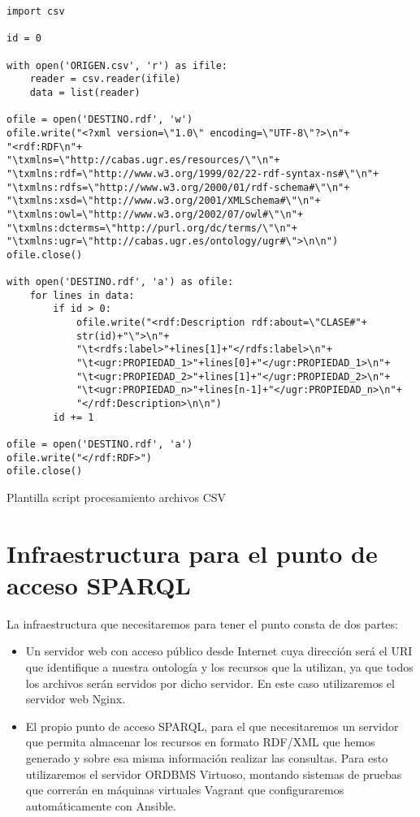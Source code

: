 \newpage
\begin{listing}[!ht]
\begin{verbatim}
import csv

id = 0

with open('ORIGEN.csv', 'r') as ifile:
    reader = csv.reader(ifile)
    data = list(reader)

ofile = open('DESTINO.rdf', 'w')
ofile.write("<?xml version=\"1.0\" encoding=\"UTF-8\"?>\n"+
"<rdf:RDF\n"+
"\txmlns=\"http://cabas.ugr.es/resources/\"\n"+
"\txmlns:rdf=\"http://www.w3.org/1999/02/22-rdf-syntax-ns#\"\n"+
"\txmlns:rdfs=\"http://www.w3.org/2000/01/rdf-schema#\"\n"+
"\txmlns:xsd=\"http://www.w3.org/2001/XMLSchema#\"\n"+
"\txmlns:owl=\"http://www.w3.org/2002/07/owl#\"\n"+
"\txmlns:dcterms=\"http://purl.org/dc/terms/\"\n"+
"\txmlns:ugr=\"http://cabas.ugr.es/ontology/ugr#\">\n\n")
ofile.close()

with open('DESTINO.rdf', 'a') as ofile:
    for lines in data:
        if id > 0:
            ofile.write("<rdf:Description rdf:about=\"CLASE#"+
            str(id)+"\">\n"+
            "\t<rdfs:label>"+lines[1]+"</rdfs:label>\n"+
            "\t<ugr:PROPIEDAD_1>"+lines[0]+"</ugr:PROPIEDAD_1>\n"+
            "\t<ugr:PROPIEDAD_2>"+lines[1]+"</ugr:PROPIEDAD_2>\n"+
            "\t<ugr:PROPIEDAD_n>"+lines[n-1]+"</ugr:PROPIEDAD_n>\n"+
            "</rdf:Description>\n\n")
        id += 1

ofile = open('DESTINO.rdf', 'a')
ofile.write("</rdf:RDF>")
ofile.close()
\end{verbatim}
\caption{Plantilla script procesamiento archivos CSV}
\end{listing}

\newpage
\section{Infraestructura para el punto de acceso SPARQL}

La infraestructura que necesitaremos para tener el punto consta de dos partes: 

\begin{itemize}
	\item Un servidor web con acceso público desde {\sf Internet} cuya dirección será el {\sf URI} que identifique a nuestra ontología y los recursos que la utilizan, ya que todos los archivos serán servidos por dicho servidor. En este caso utilizaremos el servidor web {\sf Nginx}.
	\item El propio punto de acceso {\sf SPARQL},  para el que necesitaremos un servidor que permita almacenar los recursos en formato {\sf RDF/XML} que hemos generado y sobre esa misma información realizar las consultas. Para esto utilizaremos el servidor {\sf ORDBMS} {\sf Virtuoso}, montando sistemas de pruebas que correrán en máquinas virtuales {\sf Vagrant} que configuraremos automáticamente con {\sf Ansible}.
\end{itemize}

